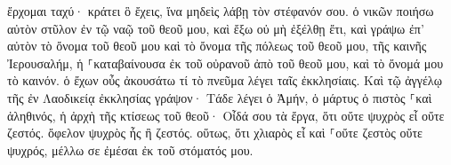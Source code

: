 \documentclass{openreader}
\begin{document}
ἔρχομαι ταχύ· κράτει ὃ ἔχεις, ἵνα μηδεὶς λάβῃ τὸν στέφανόν σου. 
ὁ νικῶν ποιήσω αὐτὸν στῦλον ἐν τῷ ναῷ τοῦ θεοῦ μου, καὶ ἔξω οὐ μὴ ἐξέλθῃ ἔτι, καὶ γράψω ἐπ’ αὐτὸν τὸ ὄνομα τοῦ θεοῦ μου καὶ τὸ ὄνομα τῆς πόλεως τοῦ θεοῦ μου, τῆς καινῆς Ἰερουσαλήμ, ἡ ⸀καταβαίνουσα ἐκ τοῦ οὐρανοῦ ἀπὸ τοῦ θεοῦ μου, καὶ τὸ ὄνομά μου τὸ καινόν. 
ὁ ἔχων οὖς ἀκουσάτω τί τὸ πνεῦμα λέγει ταῖς ἐκκλησίαις. 
Καὶ τῷ ἀγγέλῳ τῆς ἐν Λαοδικείᾳ ἐκκλησίας γράψον· Τάδε λέγει ὁ Ἀμήν, ὁ μάρτυς ὁ πιστὸς ⸀καὶ ἀληθινός, ἡ ἀρχὴ τῆς κτίσεως τοῦ θεοῦ· 
Οἶδά σου τὰ ἔργα, ὅτι οὔτε ψυχρὸς εἶ οὔτε ζεστός. ὄφελον ψυχρὸς ἦς ἢ ζεστός. 
οὕτως, ὅτι χλιαρὸς εἶ καὶ ⸀οὔτε ζεστὸς οὔτε ψυχρός, μέλλω σε ἐμέσαι ἐκ τοῦ στόματός μου. 
\end{document}
